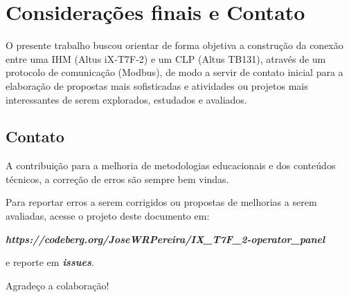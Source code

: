 \chapter{Considerações finais e Contato}
\label{chap:conclusoes-e-trabalhos-futuros}

O presente trabalho buscou orientar de forma objetiva 
a construção da conexão entre uma 
IHM (Altus iX-T7F-2) e um CLP (Altus TB131), 
através de um protocolo de comunicação (Modbus), 
de modo a servir de contato inicial para 
a elaboração de propostas mais sofisticadas e 
atividades ou projetos mais interessantes de serem explorados, 
estudados e avaliados. 




\section{Contato}
\label{sec:contato}

A contribuição para 
a melhoria de metodologias educacionais e dos conteúdos técnicos, 
a correção de erros são sempre bem vindas. 

Para reportar erros a serem corrigidos ou 
propostas de melhorias a serem avaliadas, 
acesse o projeto deste documento em:

\textbf{\textit{{https://codeberg.org/JoseWRPereira/IX\_T7F\_2-operator\_panel}}} 

e reporte em \textbf{\textit{issues}}. 



Agradeço a colaboração!



